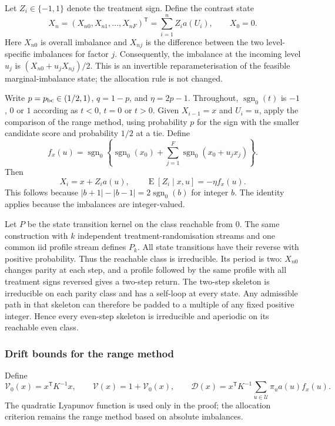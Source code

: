 \documentclass[12pt,a4paper]{article}
\theoremstyle{definition}
\theoremstyle{remark}\newtheorem{remark}{Remark}
\numberwithin{equation}{section}
\newcommand{\E}{\operatorname{E}}
\newcommand{\sg}{\operatorname{sgn}_0}
\newcommand{\trans}{^{\mathsf T}}
\begin{document}
Let $Z_i\in\{-1,1\}$ denote the treatment sign. Define the contrast state
\[
 X_n=(X_{n0},X_{n1},\ldots,X_{nF})\trans
       =\sum_{i=1}^n Z_i a(U_i),\qquad X_0=0.
\]
Here $X_{n0}$ is overall imbalance and $X_{nj}$ is the difference between the two level-specific imbalances for factor $j$. Consequently, the imbalance at the incoming level $u_j$ is $(X_{n0}+u_jX_{nj})/2$. This is an invertible reparameterisation of the feasible marginal-imbalance state; the allocation rule is not changed.

Write $p=p_{\rm bc}\in(1/2,1)$, $q=1-p$, and $\eta=2p-1$. Throughout, $\sg(t)$ is $-1$, $0$ or $1$ according as $t<0$, $t=0$ or $t>0$. Given $X_{i-1}=x$ and $U_i=u$, apply the comparison of the range method, using probability $p$ for the sign with the smaller candidate score and probability $1/2$ at a tie. Define
\begin{equation}\label{eq:fx}
 f_x(u)=\sg\left\{\sg(x_0)+\sum_{j=1}^F\sg(x_0+u_jx_j)\right\}.
\end{equation}
Then
\begin{equation}\label{eq:mean}
 X_i=x+Z_i a(u),\qquad \E[Z_i\mid x,u]=-\eta f_x(u).
\end{equation}
This follows because $|b+1|-|b-1|=2\sg(b)$ for integer $b$. The identity applies because the imbalances are integer-valued.

Let $P$ be the state transition kernel on the class reachable from $0$. The same construction with $k$ independent treatment-randomisation streams and one common iid profile stream defines $P_k$. All state transitions have their reverse with positive probability. Thus the reachable class is irreducible. Its period is two: $X_{n0}$ changes parity at each step, and a profile followed by the same profile with all treatment signs reversed gives a two-step return. The two-step skeleton is irreducible on each parity class and has a self-loop at every state. Any admissible path in that skeleton can therefore be padded to a multiple of any fixed positive integer. Hence every even-step skeleton is irreducible and aperiodic on its reachable even class.

\subsubsection{Drift bounds for the range method}\label{sec:quadratic}\label{sec:two}
Define
\begin{equation}\label{eq:QH}
 \mathcal V_0(x)=x\trans K^{-1}x,\qquad \mathcal V(x)=1+\mathcal V_0(x),\qquad
 \mathcal D(x)=x\trans K^{-1}\sum_{u\in\mathcal U}\pi_u a(u)f_x(u).
\end{equation}
The quadratic Lyapunov function is used only in the proof; the allocation criterion remains the range method based on absolute imbalances.
\end{document}
